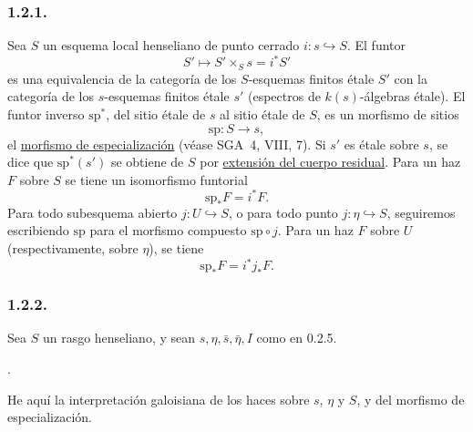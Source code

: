 \subsubsection*{1.2.1.}
Sea $S$ un esquema local henseliano de punto cerrado
$i:s\hookrightarrow S$. El funtor
\begin{equation*}
S'\longmapsto S'\times_Ss=i^*S'
\end{equation*}
es una equivalencia de la categoría de los $S$-esquemas finitos étale $S'$ con
la categoría de los $s$-esquemas finitos étale $s'$ (espectros de
$k(s)$-álgebras étale). El funtor inverso $\mathrm{sp}^*$, del sitio étale de
$s$ al sitio étale de $S$, es un morfismo de sitios
\begin{equation*}
\mathrm{sp}:S\longrightarrow s,
\end{equation*}
el \underline{morfismo de especialización} (véase SGA~4, VIII, 7). Si $s'$ es
étale sobre $s$, se dice que $\mathrm{sp}^*(s')$ se obtiene de $S$ por
\underline{extensión del cuerpo residual}. Para un haz $F$ sobre $S$ se tiene
un isomorfismo funtorial
\begin{equation}\tag{1.2.1.1}
\mathrm{sp}_*F=i^*F.
\end{equation}
Para todo subesquema abierto $j:U\hookrightarrow S$, o para todo punto
$j:\eta\hookrightarrow S$, seguiremos escribiendo $\mathrm{sp}$ para el
morfismo compuesto $\mathrm{sp}\circ j$. Para un haz $F$ sobre $U$
(respectivamente, sobre $\eta$), se tiene
\begin{equation}\tag{1.2.1.2}
\mathrm{sp}_*F=i^*j_*F.
\end{equation}

\subsubsection*{1.2.2.}
Sea $S$ un rasgo henseliano, y sean $s,\eta,\bar s,\bar\eta,I$ como en 0.2.5.
\begin{center}
.
\end{center}
\pageoriginale

He aquí la interpretación galoisiana de los haces sobre $s$, $\eta$ y $S$, y
del morfismo de especialización.

